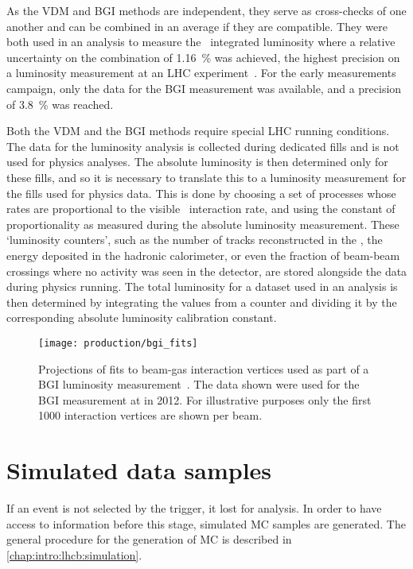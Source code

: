 As the \ac{VDM} and \ac{BGI} methods are independent, they serve as 
cross-checks of one another and can be combined in an average if they are 
compatible.
They were both used in an analysis to measure the \runone\ integrated 
luminosity where a relative uncertainty on the combination of 
\SI{1.16}{\percent} was achieved, the highest precision on a luminosity 
measurement at an \ac{LHC} experiment~\cite{LHCb-PAPER-2014-047}.
For the early measurements campaign, only the data for the \ac{BGI} measurement 
was available, and a precision of \SI{3.8}{\percent} was reached.

Both the \ac{VDM} and the \ac{BGI} methods require special \ac{LHC} running 
conditions.
The data for the luminosity analysis is collected during dedicated fills and is 
not used for physics analyses.
The absolute luminosity is then determined only for these fills, and so it is 
necessary to translate this to a luminosity measurement for the fills used for 
physics data.
This is done by choosing a set of processes whose rates are proportional to the 
visible \pp\ interaction rate, and using the constant of proportionality as 
measured during the absolute luminosity measurement.
These `luminosity counters', such as the number of tracks reconstructed in the 
\velo, the energy deposited in the hadronic calorimeter, or even the fraction 
of beam-beam crossings where no activity was seen in the detector, are stored 
alongside the data during physics running.
The total luminosity for a dataset used in an analysis is then determined by 
integrating the values from a counter and dividing it by the corresponding 
absolute luminosity calibration constant.

\begin{figure}
  \centering
  \texttt{[image: production/bgi\_fits]}
  \caption{%
    Projections of fits to beam-gas interaction vertices used as part of a 
    \acl{BGI} luminosity measurement~\cite{LHCb-PAPER-2014-047}.
    The data shown were used for the \ac{BGI} measurement at  in 
    2012.
    For illustrative purposes only the first \num{1000} interaction vertices 
    are shown per beam.
  }
  \label{fig:prod:data:lumi:bgi_fits}
\end{figure}

\section{Simulated data samples}
\label{chap:prod:data:mc}

If an event is not selected by the trigger, it lost for analysis.
In order to have access to information before this stage, simulated \acf{MC} 
samples are generated.
The general procedure for the generation of \ac{MC} is described in 
\cref{chap:intro:lhcb:simulation}.


